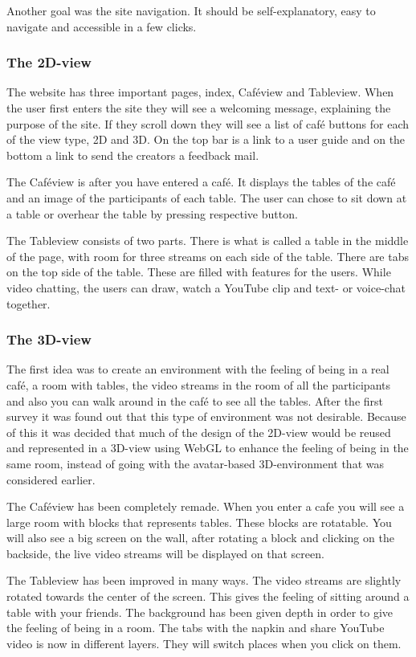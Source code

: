 \documentclass[12pt, titlepage]{article}
\begin{document}
Another goal was the site navigation. It should be self-explanatory, easy to navigate and accessible in a few clicks.
\subsubsection{The 2D-view}
The website has three important pages, index, Caféview and Tableview. When the user first enters the site they will see a welcoming message, explaining the purpose of the site. If they scroll down they will see a list of café buttons for each of the view type, 2D and 3D. On the top bar is a link to a user guide and on the bottom a link to send the creators a feedback mail.

The Caféview is after you have entered a café. It displays the tables of the café and an image of the participants of each table. The user can chose to sit down at a table or overhear the table by pressing respective button.

The Tableview consists of two parts. There is what is called a table in the middle of the page, with room for three streams on each side of the table. There are tabs on the top side of the table. These are filled with features for the users. While video chatting, the users can draw, watch a YouTube clip and text- or voice-chat together. 
\subsubsection{The 3D-view}
The first idea was to create an environment with the feeling of being in a real café, a room with tables, the video streams in the room of all the participants and also you can walk around in the café to see all the tables. After the first survey it was found out that this type of environment was not desirable. Because of this it was decided that much of the design of the 2D-view would be reused and represented in a 3D-view using WebGL to enhance the feeling of being in the same room, instead of going with the avatar-based 3D-environment that was considered earlier.

The Caféview has been completely remade. When you enter a cafe you will see a large room with blocks that represents tables. These blocks are rotatable. You will also see a big screen on the wall, after rotating a block and clicking on the backside, the live video streams will be displayed on that screen.

The Tableview has been improved in many ways. The video streams are slightly rotated towards the center of the screen. This gives the feeling of sitting around a table with your friends. The background has been given depth in order to give the feeling of being in a room. The tabs with the napkin and share YouTube video is now in different layers. They will switch places when you click on them.
\end{document}
